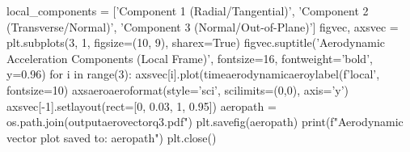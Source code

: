 {}
\markdownRendererSectionEnd \markdownRendererSectionBegin
{}\markdownRendererInterblockSeparator
{}local_components = ['Component 1 (Radial/Tangential)', 'Component 2 (Transverse/Normal)', 'Component 3 (Normal/Out-of-Plane)']\markdownRendererInterblockSeparator
{}
\markdownRendererSectionEnd \markdownRendererSectionBegin
\markdownRendererHeadingOne{-------------------------------------------------------------------------}\markdownRendererInterblockSeparator
{}
\markdownRendererSectionEnd \markdownRendererSectionBegin
{}\markdownRendererInterblockSeparator
{}
\markdownRendererSectionEnd \markdownRendererSectionBegin
\markdownRendererHeadingOne{-------------------------------------------------------------------------}\markdownRendererInterblockSeparator
{}figvec, axsvec = plt.subplots(3, 1, figsize=(10, 9), sharex=True) figvec.suptitle('Aerodynamic Acceleration Components (Local Frame)', fontsize=16, fontweight='bold', y=0.96) for i in range(3): axsvec[i].plot(timeaerodynamicaeroylabel(f'{local\n[m/s²]', fontsize=10) axs}aeroaeroformat(style='sci', scilimits=(0,0), axis='y') axsvec[-1].setlayout(rect=[0, 0.03, 1, 0.95]) aeropath = os.path.join(outputaerovectorq3.pdf") plt.savefig(aeropath) print(f"Aerodynamic vector plot saved to: {aeropath}") plt.close()\markdownRendererInterblockSeparator
{}
\markdownRendererSectionEnd \markdownRendererSectionBegin
\markdownRendererHeadingOne{-------------------------------------------------------------------------}\markdownRendererInterblockSeparator
{}
\markdownRendererSectionEnd \markdownRendererSectionBegin
{}\markdownRendererInterblockSeparator
{}
\markdownRendererSectionEnd \markdownRendererSectionBegin
